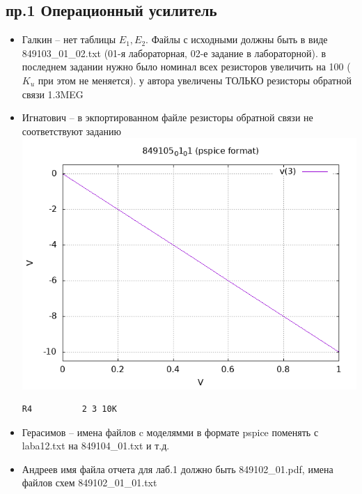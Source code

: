 \documentclass[a4paper,landscape,11pt]{article}
\begin{document}
\subsection*{пр.1 Операционный усилитель}
\begin{itemize}
	\item Галкин -- нет таблицы $E_1,E_2$. Файлы с исходными должны быть в виде 849103\_01\_02.txt (01-я лабораторная, 02-е задание в лабораторной).
в последнем задании нужно было номинал всех  резисторов увеличить на 100 ($K_u$ при этом не меняется). у автора увеличены ТОЛЬКО резисторы обратной связи  1.3MEG

\item Игнатович -- в экпортированном файле резисторы обратной связи не соответствуют заданию
\includegraphics[scale=0.2]{"849105_01_01"}
\begin{verbatim}
R4          2 3 10K
\end{verbatim}
\item Герасимов -- %
имена файлов c моделямми в формате pspice поменять с laba12.txt на 849104\_01.txt и т.д.

\item Андреев имя файла отчета для лаб.1 должно быть 849102\_01.pdf, имена файлов схем 849102\_01\_01.txt
\end{itemize}
\end{document}
